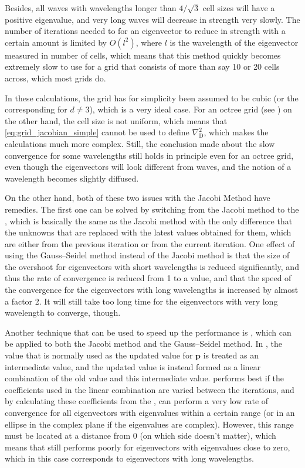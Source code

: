 Besides, all waves with wavelengths longer than $4/\sqrt{3}$ cell sizes will have a positive eigenvalue, and very long waves will decrease in strength very slowly. The number of iterations needed to for an eigenvector to reduce in strength with a certain amount is limited by $O(l^2)$, where $l$ is the wavelength of the eigenvector measured in number of cells, which means that this method quickly becomes extremely slow to use for a grid that consists of more than say 10 or 20 cells across, which most grids do.

In these calculations, the grid has for simplicity been assumed to be cubic (or the corresponding for $d \neq 3$), which is a very ideal case. For an octree grid (see ) on the other hand, the cell size is not uniform, which means that \eqref{eq:grid_jacobian_simple} cannot be used to define $\nabla^2_{\text{D}}$, which makes the calculations much more complex. Still, the conclusion made about the slow convergence for some wavelengths still holds in principle even for an octree grid, even though the eigenvectors will look different from waves, and the notion of a wavelength becomes slightly diffused.

On the other hand, both of these two issues with the Jacobi Method have remedies. The first one can be solved by switching from the Jacobi method to the , which is basically the same as the Jacobi method with the only difference that the unknowns that are replaced with the latest values obtained for them, which are either from the previous iteration or from the current iteration. One effect of using the Gauss--Seidel method instead of the Jacobi method is that the size of the overshoot for eigenvectors with short wavelengths is reduced significantly, and thus the rate of convergence is reduced from 1 to a value, and that the speed of the convergence for the eigenvectors with long wavelengths is increased by almost a factor 2. It will still take too long time for the eigenvectors with very long wavelength to converge, though.

Another technique that can be used to speed up the performance is \SOR, which can be applied to both the Jacobi method and the Gauss--Seidel method. In \SOR, the value that is normally used as the updated value for $\mathbf{p}$ is treated as an intermediate value, and the updated value is instead formed as a linear combination of the old value and this intermediate value. \SOR performs best if the coefficients used in the linear combination are varied between the iterations, and by calculating these coefficients from the , \SOR can perform a very low rate of convergence for all eigenvectors with eigenvalues within a certain range (or in an ellipse in the complex plane if the eigenvalues are complex). However, this range must be located at a distance from 0 (on which side doesn't matter), which means that \SOR still performs poorly for eigenvectors with eigenvalues close to zero, which in this case corresponds to eigenvectors with long wavelengths.

